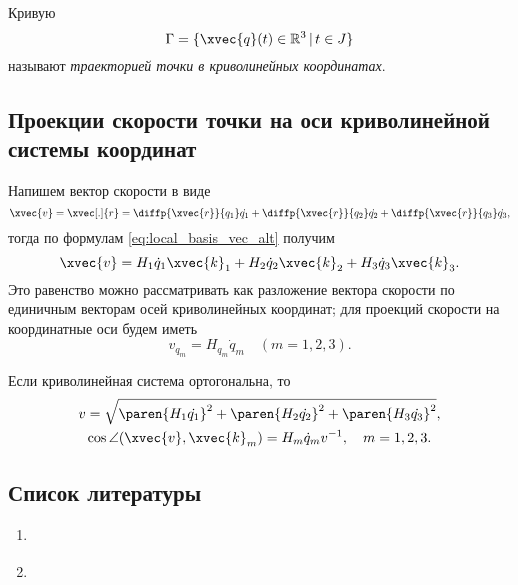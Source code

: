 \begin{definition}
  Кривую
  \begin{equation*}
    \Gamma = \{ \xvec{q}(t) \in \mathbb{R}^3 \, | \, t \in J \}
  \end{equation*}
  называют \textit{траекторией точки в криволинейных координатах}.
\end{definition}

\subsection{Проекции скорости точки на оси криволинейной системы координат}

Напишем вектор скорости в виде
\begin{equation}
  \label{eq:velocity_def}
  \xvec{v} = \xvec[.]{r} = \diffp{\xvec{r}}{{q_1}} \dot{q_1} +
  \diffp{\xvec{r}}{{q_2}} \dot{q_2} + \diffp{\xvec{r}}{{q_3}} \dot{q_3},
\end{equation}
тогда по формулам \ref{eq:local_basis_vec_alt} получим
\begin{equation*}
  \xvec{v} = H_1 \dot{q}_1 \xvec{k}_1 + H_2 \dot{q}_2 \xvec{k}_2 + H_3
  \dot{q}_3 \xvec{k}_3.
\end{equation*}
Это равенство можно рассматривать как разложение вектора скорости по единичным
векторам осей криволинейных координат; для проекций скорости на координатные
оси будем иметь
\begin{equation}
  \label{eq:velocity_proj}
  v_{q_m} = H_{q_m} \dot{q}_m \quad (m = 1,2,3).
\end{equation}

Если криволинейная система ортогональна, то
\begin{equation}
  \begin{gathered}
    v = \sqrt{\paren{H_1 \dot{q_1}}^2 + \paren{H_2 \dot{q_2}}^2 + \paren{H_3
      \dot{q_3}}^2}, \\
    \cos\angle (\xvec{v}, \xvec{k}_m) = H_m \dot{q}_m v^{-1},
      \quad m = 1,2,3.
  \end{gathered}
\end{equation}

\subsection{Список литературы}
\begin{enumerate}
  \item \cite{lectures}
  \item \cite{lourie}
\end{enumerate}

